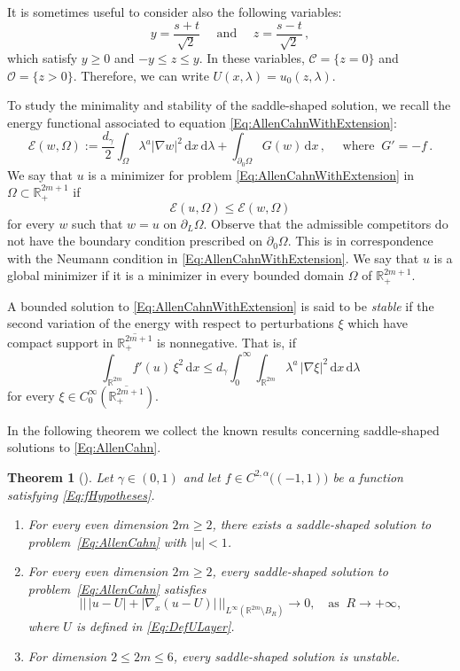 \documentclass[12pt,reqno]{amsart}
\newtheorem{theorem}{Theorem}[section]
\theoremstyle{definition}
\theoremstyle{remark}
\newcommand{\con}[1]{\mathbb{#1}}
\newcommand{\R}{\con{R}} %
\newcommand{\ccal}{\mathscr{C}}
\newcommand{\ecal}{\mathcal{E}}
\newcommand{\ocal}{\mathcal{O}}
\newcommand{\s}{\gamma}
\renewcommand{\d}{\,\mathrm{d}} %
\numberwithin{equation}{section}
\begin{document}
It is sometimes useful to consider also the following variables:
$$
y = \dfrac{s+t}{\sqrt{2}} \quad \text{ and } \quad z = \dfrac{s-t}{\sqrt{2}} \,,
$$
which satisfy $y\geq 0$ and $-y \leq z \leq y$. In these variables, $\ccal = \{ z = 0\}$ and $\ocal = \{ z > 0\}$. Therefore, we can write $U(x,\lambda) = u_0(z, \lambda)$.




 
To study the minimality and stability of the saddle-shaped solution, we recall the energy functional associated to equation \eqref{Eq:AllenCahnWithExtension}:
$$
\ecal (w, \Omega) := \dfrac{d_\s}{2}\int_{\Omega} \lambda^a | \nabla w |^2 \d x \d \lambda + \int_{\partial_0 \Omega} G(w)\d x\,, \quad \text{ where }\ G' = -f\,.
$$
We say that $u$ is a minimizer for problem \eqref{Eq:AllenCahnWithExtension} in  $\Omega \subset \R^{2m+1}_+$ if
$$
\ecal(u,\Omega) \leq \ecal(w,\Omega)
$$
for every $w$ such that $w=u$ on $\partial_L \Omega$. Observe that the admissible competitors do not have the boundary condition prescribed on $\partial_0\Omega$. This is in correspondence with the Neumann condition in \eqref{Eq:AllenCahnWithExtension}. We say that $u$ is a global minimizer if it is a minimizer in every bounded domain $\Omega$ of $\R^{2m+1}_+$.

A bounded solution to \eqref{Eq:AllenCahnWithExtension} is said to be \emph{stable} if the second variation of the energy with respect to perturbations $\xi$ which have compact support in $\overline{\R^{2m+1}_+}$ is nonnegative. That is, if
\begin{equation}
\label{Eq:StabilityCondition}
\int_{\R^{2m}} f'(u) \, \xi^2 \d x  \leq d_\s \int_0^\infty \int_{\R^{2m}} \lambda^a \, |\nabla \xi|^2 \d x \d \lambda 
\end{equation}
for every $\xi \in C^\infty_0(\overline{\R^{2m+1}_+})$.

In the following theorem we collect the known results concerning saddle-shaped solutions to \eqref{Eq:AllenCahn}. 

\begin{theorem}[\cite{Cinti-Saddle,Cinti-Saddle2,CabreSolaMorales,CabreSireII}]
\label{Th:Summary}
Let $\s \in (0,1)$  and let $f\in C^{2,\alpha}\big((-1,1)\big)$ be a function satisfying \eqref{Eq:fHypotheses}.
\begin{enumerate}[label=(\roman{*})]
\item For every even dimension $2m\geq 2$, there exists a saddle-shaped solution to  problem~\eqref{Eq:AllenCahn} with $|u|<1$.
\item For every even dimension $2m\geq 2$, every saddle-shaped solution to problem~\eqref{Eq:AllenCahn} satisfies
$$ \big|\big| \, |u-U| + |\nabla_x(u-U)| \, \big|\big|_{L^\infty(\R^{2m}\setminus B_R)} \to 0, \ \ \ \text{ as } \ R\to+\infty, $$
where $U$ is defined in \eqref{Eq:DefULayer}.
\item For dimension $2\leq 2m \leq 6$, every saddle-shaped solution is unstable.
\end{enumerate}
\end{theorem}
\end{document}
